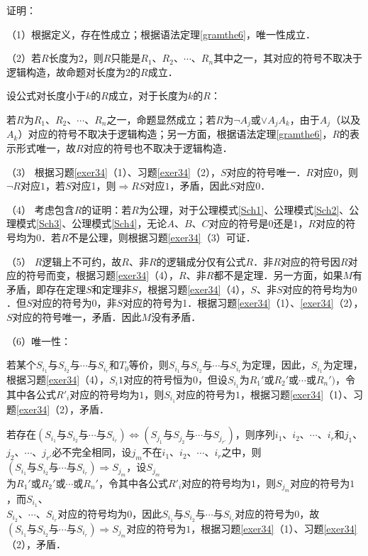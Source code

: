 \documentclass[12pt, a4paper, oneside]{book}
\begin{document}
			证明：
			\par
			（1）根据定义，存在性成立；根据语法定理\ref{gramthe6}，唯一性成立．
			\par
			（2）若$R$长度为$2$，则$R$只能是$R_1$、$R_2$、$\cdots$、$R_n$其中之一，其对应的符号不取决于逻辑构造，故命题对长度为$2$的$R$成立．
			\par
			设公式对长度小于$k$的$R$成立，对于长度为$k$的$R$：
			\par
			若$R$为$R_1$、$R_2$、$\cdots$、$R_n$之一，命题显然成立；若$R$为$\neg A_j$或$\lor A_j A_k$，由于$A_j$（以及$A_k$）对应的符号不取决于逻辑构造；另一方面，根据语法定理\ref{gramthe6}，$R$的表示形式唯一，故$R$对应的符号也不取决于逻辑构造．
			\par
			（3）	根据习题\ref{exer34}（1）、习题\ref{exer34}（2），$S$对应的符号唯一．$R$对应$0$，则$\neg R$对应$1$，若$S$对应1，则$\Rightarrow RS$对应$1$，矛盾，因此$S$对应$0$．
			\par
			（4）	考虑包含$R$的证明：若$R$为公理，对于公理模式\ref{Sch1}、公理模式\ref{Sch2}、公理模式\ref{Sch3}、公理模式\ref{Sch4}，无论$A$、$B$、$C$对应的符号是$0$还是$1$，$R$对应的符号均为$0$．若$R$不是公理，则根据习题\ref{exer34}（3）可证．
			\par
			（5）	$R$逻辑上不可约，故$R$、$\text{非}R$的逻辑成分仅有公式$R$．$\text{非}R$对应的符号因$R$对应的符号而变，根据习题\ref{exer34}（4），$R$、$\text{非}R$都不是定理．另一方面，如果$M$有矛盾，即存在定理$S$和定理$\text{非}S$，根据习题\ref{exer34}（4），$S$、$\text{非}S$对应的符号均为$0$．但$S$对应的符号为$0$，$\text{非}S$对应的符号为1．根据习题\ref{exer34}（1）、\ref{exer34}（2），$S$对应的符号唯一，矛盾．因此$M$没有矛盾．
			\par
			（6）唯一性：
			\par
			若某个$S_{i_1}\text{与}S_{i_2}\text{与}\cdots\text{与}S_{i_r}$和$T_0$等价，则$S_{i_1}\text{与}S_{i_2}\text{与}\cdots\text{与}S_{i_r}$为定理，因此，$S_{i_1}$为定理，根据习题\ref{exer34}（4），$S_i1$对应的符号恒为$0$，但设$S_{i_1}$为$R_1'\text{或}R_2'\text{或}\cdots\text{或}R_n')$，令其中各公式${R'}_i$对应的符号均为$1$，则$S_{i_1}$对应的符号为$1$，根据习题\ref{exer34}（1）、习题\ref{exer34}（2），矛盾．
			\par
			若存在$(S_{i_1}\text{与}S_{i_2}\text{与}\cdots\text{与}S_{i_r})\Leftrightarrow (S_{j_1}\text{与}S_{j_2}\text{与}\cdots\text{与}S_{j_{r'}})$，则序列$i_1$、$i_2$、$\cdots$、$i_r$和$j_1$、$j_2$、$\cdots$、$j_{r'}$必不完全相同，设$j_m$不在$i_1$、$i_2$、$\cdots$、$i_r$之中，则$(S_{i_1}\text{与}S_{i_2}\text{与}\cdots\text{与}S_{i_r})\Rightarrow S_{j_m}$，设$S_{j_m}$\\为$R_1'\text{或}R_2'\text{或}\cdots\text{或}R_n'$，令其中各公式${R'}_i$对应的符号均为$1$，则$S_{j_m}$对应的符号为$1$，而$S_{i_1}$、\\$S_{i_2}$、$\cdots$、$S_{i_r}$对应的符号均为$0$，因此$S_{i_1}\text{与}S_{i_2}\text{与}\cdots\text{与}S_{i_r}$对应的符号为$0$，故\\$(S_{i_1}\text{与}S_{i_2}\text{与}\cdots\text{与}S_{i_r})\Rightarrow S_{j_m}$对应的符号为$1$，根据习题\ref{exer34}（1）、习题\ref{exer34}（2），矛盾．
\end{document}
